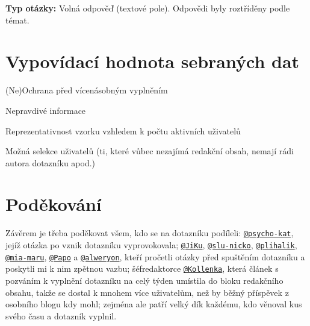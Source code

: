 \documentclass[12pt, a4paper, twoside]{article}
\makeatletter
\newcommand{\suser}[1]{\href{https://www.signaly.cz/#1}{\texttt{@#1}}}
\newcommand{\qtype}{\textbf{Typ otázky:}
}
\newcommand{\freeEntry}{Volná odpověď (textové pole)}
\makeatother
\begin{document}
\qtype \freeEntry.
Odpovědi byly roztříděny podle témat.



\section{Vypovídací hodnota sebraných dat}

(Ne)Ochrana před vícenásobným vyplněním

Nepravdivé informace

Reprezentativnost vzorku vzhledem k počtu aktivních uživatelů

Možná selekce uživatelů (ti, které vůbec nezajímá redakční obsah,
nemají rádi autora dotazníku apod.)

\section*{Poděkování}

Závěrem je třeba poděkovat všem, kdo se na dotazníku podíleli:
\suser{psycho-kat}, jejíž otázka po 
vznik dotazníku vyprovokovala;
\suser{JiKu}, \suser{slu-nicko}, \suser{plihalik}, \suser{mia-maru},
\suser{Papo} a \suser{alweryon}, kteří pročetli otázky před spuštěním
dotazníku a poskytli mi k nim zpětnou vazbu;
šéfredaktorce \suser{Kollenka}, která článek s pozváním k vyplnění
dotazníku na celý týden umístila do bloku redakčního obsahu,
takže se dostal
k mnohem více uživatelům, než by běžný příspěvek z osobního blogu
kdy mohl;
zejména ale patří velký dík každému, kdo věnoval kus svého času
a dotazník vyplnil.

\tableofcontents

\printbibliography
\end{document}
